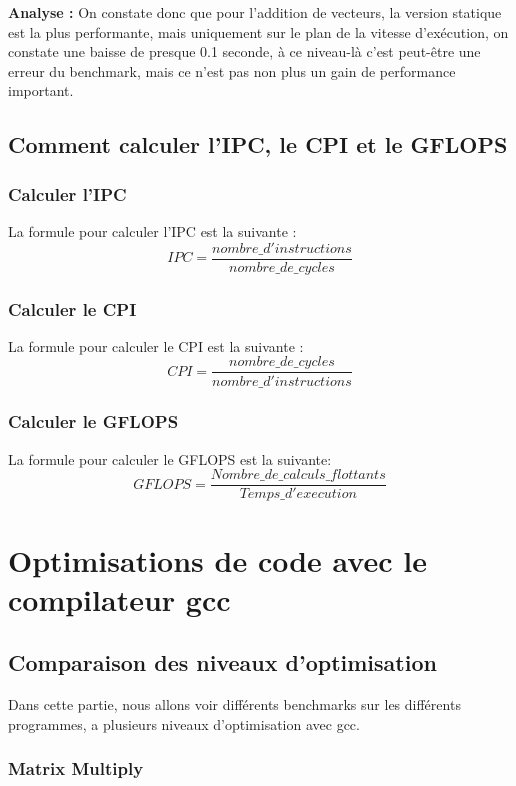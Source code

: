 \documentclass{rapport}
\begin{document}
\textbf{Analyse :} On constate donc que pour l'addition de vecteurs, la version statique est la plus performante, mais uniquement sur le plan de la vitesse d'exécution,
on constate une baisse de presque 0.1 seconde, à ce niveau-là c'est peut-être une erreur du benchmark, mais ce n'est pas non plus un gain de performance important.

\subsection{Comment calculer l'IPC, le CPI et le GFLOPS}

\subsubsection{Calculer l'IPC}
La formule pour calculer l'IPC est la suivante :
\[
IPC = \frac{nombre\_d'instructions}{nombre\_de\_cycles}
\]


\subsubsection{Calculer le CPI}
La formule pour calculer le CPI est la suivante :
\[
CPI = \frac{nombre\_de\_cycles}{nombre\_d'instructions}
\]

\subsubsection{Calculer le GFLOPS}
La formule pour calculer le GFLOPS est la suivante:
\[
GFLOPS = \frac{Nombre\_de\_calculs\_flottants}{Temps\_d'execution}
\]



\section{Optimisations de code avec le compilateur gcc}
\subsection{Comparaison des niveaux d'optimisation}
Dans cette partie, nous allons voir différents benchmarks sur les différents programmes, a plusieurs niveaux d'optimisation avec gcc.

\subsubsection{Matrix Multiply}
\end{document}
